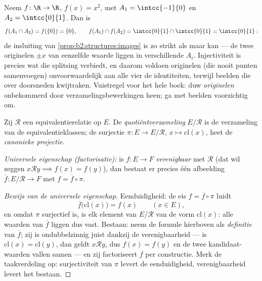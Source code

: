 \begin{example}\label{ex:b2:structures:imagestrict}
Neem $f \colon \R \to \R$, $f(x) = x^2$, met $A_1 =
\intcc{-1}{0}$ en $A_2 = \intcc{0}{1}$. Dan is
\[
f(A_1 \cap A_2) = f(\{0\}) = \{0\},
\qquad
f(A_1) \cap f(A_2) = \intcc{0}{1} \cap \intcc{0}{1} =
\intcc{0}{1} :
\]
de insluiting van \cref{prop:b2:structures:images} is zo strikt
als maar kan --- de twee originelen $\pm x$ van eenzelfde waarde
liggen in verschillende $A_i$. Injectiviteit is precies wat die
splitsing verbiedt, en daarom voldoen originelen (die nooit punten
samenvoegen) onvoorwaardelijk aan alle vier de identiteiten,
terwijl beelden die over doorsneden kwijtraken. Vuistregel voor
het hele boek: duw \emph{originelen} onbekommerd door
verzamelingsbewerkingen heen; ga met beelden voorzichtig om.
\end{example}

\begin{definition}[Quotiëntverzameling]\label{def:b2:structures:quotient}
Zij $\mathcal{R}$ een equivalentierelatie op $E$. De
\emph{quotiëntverzameling}
$E/\mathcal{R}$ is de verzameling van de equivalentieklassen; de
surjectie $\pi \colon E \to E/\mathcal{R}$, $x \mapsto
\mathrm{cl}(x)$, heet de \emph{canonieke
projectie}.

\emph{Universele eigenschap (factorisatie):} is $f \colon E \to F$
\emph{verenigbaar} met $\mathcal{R}$ (dat wil zeggen $x
\mathbin{\mathcal{R}} y \implies f(x) = f(y)$), dan bestaat er
precies één afbeelding $\overline f \colon E/\mathcal{R} \to F$
met $f = \overline f \circ \pi$.
\end{definition}

\begin{proof}[Bewijs van de universele eigenschap]
Eenduidigheid: de eis $f = \overline f \circ \pi$ luidt
\[
\overline f\bigl(\mathrm{cl}(x)\bigr) = f(x)
\qquad (x \in E),
\]
en omdat $\pi$ surjectief is, is elk element van $E/\mathcal{R}$
van de vorm $\mathrm{cl}(x)$: alle waarden van $\overline f$
liggen dus vast. Bestaan: neem de formule hierboven als
\emph{definitie} van $\overline f$; zij is ondubbelzinnig juist
dankzij de verenigbaarheid --- is $\mathrm{cl}(x) =
\mathrm{cl}(y)$, dan geldt $x \mathbin{\mathcal{R}} y$, dus $f(x)
= f(y)$ en de twee kandidaat-waarden vallen samen --- en zij
factoriseert $f$ per constructie. Merk de taakverdeling op:
surjectiviteit van $\pi$ levert de eenduidigheid, verenigbaarheid
levert het bestaan.
\end{proof}

